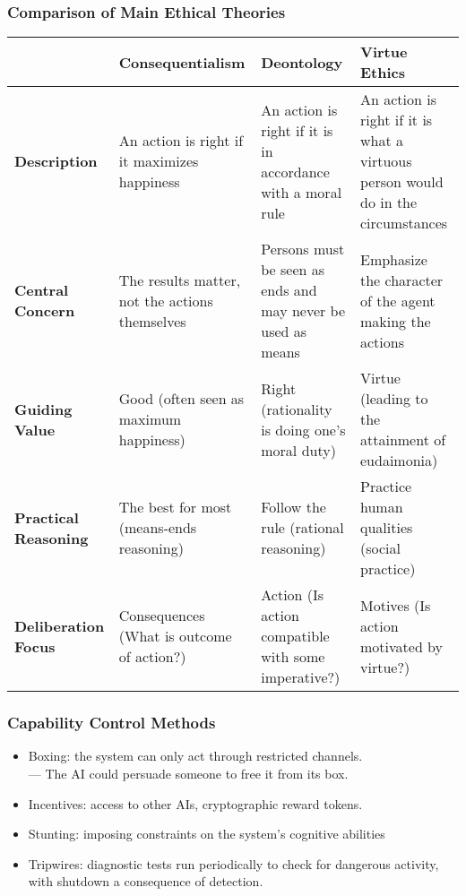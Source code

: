 \documentclass[UTF8,11pt,colorlinks,compress,openany]{beamer}%
\begin{document}
\begin{frame}\frametitle{Comparison of Main Ethical Theories}\small
\begin{table}[H]
\begin{tabu}{p{0.15\textwidth}|p{0.21\textwidth}|p{0.23\textwidth}|p{0.25\textwidth}}
\hline
& \textbf{Consequentialism} & \textbf{Deontology} & \textbf{Virtue Ethics}\\
\hline
\textbf{Description} & An action is right if it maximizes happiness & An action is right if it is in accordance with a moral rule & An action is right if it is what a virtuous person would do in the circumstances\\
\hline
\textbf{Central Concern} & The results matter, not the actions themselves & Persons must be seen as ends and may never be used as means & Emphasize the character of the agent making the actions\\
\hline
\textbf{Guiding Value} & Good (often seen as maximum happiness) & Right (rationality is doing one's moral duty) & Virtue (leading to the attainment of eudaimonia)\\
\hline
\textbf{Practical Reasoning} & The best for most (means-ends reasoning) & Follow the rule (rational reasoning) & Practice human qualities (social practice)\\
\hline
\textbf{Deliberation Focus} & Consequences (What is outcome of action?) & Action (Is action compatible with some imperative?) & Motives (Is action motivated by virtue?)\\
\hline
\end{tabu}
\end{table}
\end{frame}

\begin{frame}\frametitle{Capability Control Methods}
\begin{itemize}
	\item Boxing: the system can only act through restricted channels.\\
	--- The AI could persuade someone to free it from its box.
	\item Incentives: access to other AIs, cryptographic reward tokens.
	\item Stunting: imposing constraints on the system's cognitive abilities
	\item Tripwires: diagnostic tests run periodically to check for dangerous activity, with shutdown a consequence of detection.
\end{itemize}
\end{frame}
\end{document}
